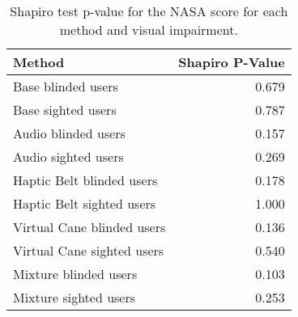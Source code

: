 
\begin{table}[!htb]
\centering
\caption{Shapiro test p-value for the NASA score for each method and visual impairment.}
\label{tab:shapiro_nasa_score}
\begin{tabular}{lr}
\toprule
                    Method &  Shapiro P-Value \\
\midrule
        Base blinded users &            0.679 \\
        Base sighted users &            0.787 \\
       Audio blinded users &            0.157 \\
       Audio sighted users &            0.269 \\
 Haptic Belt blinded users &            0.178 \\
 Haptic Belt sighted users &            1.000 \\
Virtual Cane blinded users &            0.136 \\
Virtual Cane sighted users &            0.540 \\
     Mixture blinded users &            0.103 \\
     Mixture sighted users &            0.253 \\
\bottomrule
\end{tabular}
\end{table}

